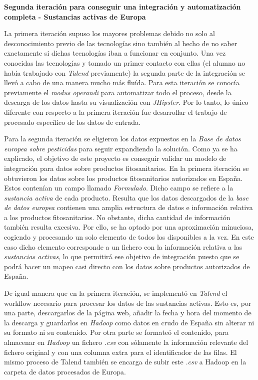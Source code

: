 \par 
\textbf{Segunda iteración para conseguir una integración y automatización completa - Sustancias activas de Europa}
\bigskip
\par 
La primera iteración supuso los mayores problemas debido no solo al desconocimiento previo de las tecnologías sino también al hecho de no saber exactamente si dichas tecnologías iban a funcionar en conjunto. Una vez conocidas las tecnologías y tomado un primer contacto con ellas (el alumno no había trabajado con \textit{Talend} previamente) la segunda parte de la integración se llevó a cabo de una manera mucho más fluída. Para esta iteración se conocía previamente el \textit{modus operandi} para automatizar todo el proceso, desde la descarga de los datos hasta su visualización con \textit{JHipster}. Por lo tanto, lo único diferente con respecto a la primera iteración fue desarrollar el trabajo de procesado específico de los datos de entrada. 
\par  
Para la segunda iteración se eligieron los datos expuestos en la \textit{Base de datos europea sobre pesticidas} \cite{pesticides_eu} para seguir expandiendo la solución. Como ya se ha explicado, el objetivo de este proyecto es conseguir validar un modelo de integración para datos sobre productos fitosanitarios. En la primera iteración se obtuvieron los datos sobre los productos fitosanitarios autorizados en España. Estos contenían un campo llamado \textit{Formulado}. Dicho campo se refiere a la \textit{sustancia activa} de cada producto. Resulta que los datos descargados de la \textit{base de datos europea} contienen una amplia estructura de datos e información relativa a los productos fitosanitarios. No obstante, dicha cantidad de información también resulta excesiva. Por ello, se ha optado por una aproximación minuciosa, cogiendo y procesando un solo elemento de todos los disponibles a la vez. En este caso dicho elemento corresponde a un fichero con la información relativa a las \textit{sustancias activas}, lo que permitirá ese objetivo de integración puesto que se podrá hacer un mapeo casi directo con los datos sobre productos autorizados de España. 
\par 
De igual manera que en la primera iteración, se implementó en \textit{Talend} el workflow necesario para procesar los datos de las sustancias activas. Esto es, por una parte, descargarlos de la página web, añadir la fecha y hora del momento de la descarga y guardarlos en \textit{Hadoop} como datos en crudo de España sin alterar ni su formato ni su contenido. Por otra parte se formateó el contenido, para almacenar en \textit{Hadoop} un fichero \textit{.csv} con sólamente la información relevante del fichero original y con una columna extra para el identificador de las filas. El mismo proceso de Talend también se encarga de subir este \textit{.csv} a Hadoop en la carpeta de datos procesados de Europa. 
